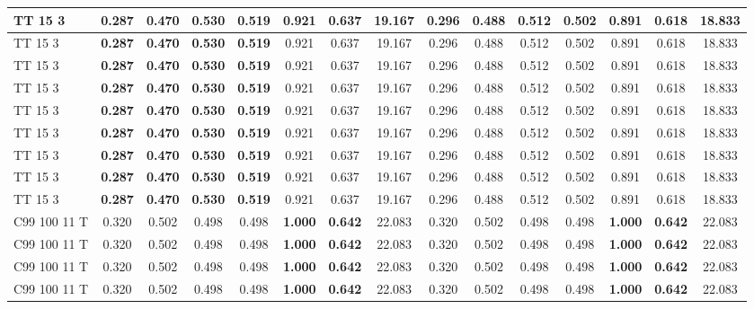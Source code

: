 \documentclass{article}
\begin{document}
\begin{longtable}[c]{|l|c|c|c|c|c|c|c||c|c|c|c|c|c|c|}
TT 15  3 & \textbf{0.287} & \textbf{0.470} & \textbf{0.530} & \textbf{0.519} & 0.921 & 0.637 & 19.167 & 0.296 & 0.488 & 0.512 & 0.502 & 0.891 & 0.618 & 18.833\\ \hline
TT 15  3 & \textbf{0.287} & \textbf{0.470} & \textbf{0.530} & \textbf{0.519} & 0.921 & 0.637 & 19.167 & 0.296 & 0.488 & 0.512 & 0.502 & 0.891 & 0.618 & 18.833\\ \hline
TT 15  3 & \textbf{0.287} & \textbf{0.470} & \textbf{0.530} & \textbf{0.519} & 0.921 & 0.637 & 19.167 & 0.296 & 0.488 & 0.512 & 0.502 & 0.891 & 0.618 & 18.833\\ \hline
TT 15  3 & \textbf{0.287} & \textbf{0.470} & \textbf{0.530} & \textbf{0.519} & 0.921 & 0.637 & 19.167 & 0.296 & 0.488 & 0.512 & 0.502 & 0.891 & 0.618 & 18.833\\ \hline
TT 15  3 & \textbf{0.287} & \textbf{0.470} & \textbf{0.530} & \textbf{0.519} & 0.921 & 0.637 & 19.167 & 0.296 & 0.488 & 0.512 & 0.502 & 0.891 & 0.618 & 18.833\\ \hline
TT 15  3 & \textbf{0.287} & \textbf{0.470} & \textbf{0.530} & \textbf{0.519} & 0.921 & 0.637 & 19.167 & 0.296 & 0.488 & 0.512 & 0.502 & 0.891 & 0.618 & 18.833\\ \hline
TT 15  3 & \textbf{0.287} & \textbf{0.470} & \textbf{0.530} & \textbf{0.519} & 0.921 & 0.637 & 19.167 & 0.296 & 0.488 & 0.512 & 0.502 & 0.891 & 0.618 & 18.833\\ \hline
TT 15  3 & \textbf{0.287} & \textbf{0.470} & \textbf{0.530} & \textbf{0.519} & 0.921 & 0.637 & 19.167 & 0.296 & 0.488 & 0.512 & 0.502 & 0.891 & 0.618 & 18.833\\ \hline
TT 15  3 & \textbf{0.287} & \textbf{0.470} & \textbf{0.530} & \textbf{0.519} & 0.921 & 0.637 & 19.167 & 0.296 & 0.488 & 0.512 & 0.502 & 0.891 & 0.618 & 18.833\\ \hline\hline
C99 100 11 T & 0.320 & 0.502 & 0.498 & 0.498 & \textbf{1.000} & \textbf{0.642} & 22.083 & 0.320 & 0.502 & 0.498 & 0.498 & \textbf{1.000} & \textbf{0.642} & 22.083\\ \hline
C99 100 11 T & 0.320 & 0.502 & 0.498 & 0.498 & \textbf{1.000} & \textbf{0.642} & 22.083 & 0.320 & 0.502 & 0.498 & 0.498 & \textbf{1.000} & \textbf{0.642} & 22.083\\ \hline
C99 100 11 T & 0.320 & 0.502 & 0.498 & 0.498 & \textbf{1.000} & \textbf{0.642} & 22.083 & 0.320 & 0.502 & 0.498 & 0.498 & \textbf{1.000} & \textbf{0.642} & 22.083\\ \hline
C99 100 11 T & 0.320 & 0.502 & 0.498 & 0.498 & \textbf{1.000} & \textbf{0.642} & 22.083 & 0.320 & 0.502 & 0.498 & 0.498 & \textbf{1.000} & \textbf{0.642} & 22.083\\ \hline

\end{longtable}
\end{document}

